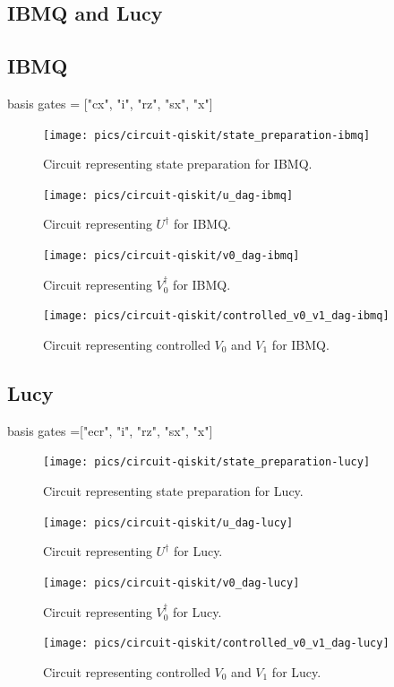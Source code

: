 \documentclass[preprint,12pt, a4paper]{elsarticle}
\newcommand{\1}{{\rm 1\hspace{-0.9mm}l}}
\begin{document}
\subsection{IBMQ and Lucy}

\subsection{IBMQ}
 basis gates = ["cx", "i", "rz", "sx", "x"]
\begin{figure}[h!]
\centering
\texttt{[image: pics/circuit-qiskit/state\_preparation-ibmq]}
\caption{Circuit representing state preparation for IBMQ.}
\end{figure}
\begin{figure}[h!]
\centering
\texttt{[image: pics/circuit-qiskit/u\_dag-ibmq]}
\caption{Circuit representing $U^\dagger$ for IBMQ.}
\end{figure}
\begin{figure}[h!]
\centering
\texttt{[image: pics/circuit-qiskit/v0\_dag-ibmq]}
\caption{Circuit representing $V_0^\dagger$ for IBMQ.}
\end{figure}
\begin{figure}[h!]
\centering
\texttt{[image: pics/circuit-qiskit/controlled\_v0\_v1\_dag-ibmq]}
\caption{Circuit representing controlled $V_0$ and $V_1$ for IBMQ.}
\end{figure}

\subsection{Lucy}
 basis gates  =["ecr", "i", "rz", "sx", "x"] 
\begin{figure}[h!]
\centering
\texttt{[image: pics/circuit-qiskit/state\_preparation-lucy]}
\caption{Circuit representing state preparation for Lucy.}
\end{figure}
\begin{figure}[h!]
\centering
\texttt{[image: pics/circuit-qiskit/u\_dag-lucy]}
\caption{Circuit representing $U^\dagger$ for Lucy.}
\end{figure}
\begin{figure}[h!]
\centering
\texttt{[image: pics/circuit-qiskit/v0\_dag-lucy]}
\caption{Circuit representing $V_0^\dagger$ for Lucy.}
\end{figure}
\begin{figure}[h!]
\centering
\texttt{[image: pics/circuit-qiskit/controlled\_v0\_v1\_dag-lucy]}
\caption{Circuit representing controlled $V_0$ and $V_1$ for Lucy.}
\end{figure}
\end{document}
